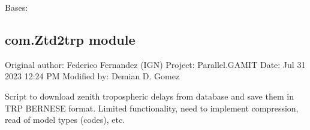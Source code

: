 \documentclass[letterpaper,10pt,english]{sphinxmanual}
\begin{document}
\begin{fulllineitems}
\label{\detokenize{com:com.UpdateEarthquakes.AddEarthquakes}}
\pysigstartsignatures
{}
\pysigstopsignatures
\sphinxAtStartPar
Bases: 

\end{fulllineitems}


\begin{fulllineitems}
\label{\detokenize{com:com.UpdateEarthquakes.getTimeSegments2}}
\pysigstartsignatures
{}
\pysigstopsignatures
\end{fulllineitems}


\begin{fulllineitems}
\label{\detokenize{com:com.UpdateEarthquakes.main}}
\pysigstartsignatures
{}
\pysigstopsignatures
\end{fulllineitems}



\subsection{com.Ztd2trp module}
\label{\detokenize{com:module-com.Ztd2trp}}\label{\detokenize{com:com-ztd2trp-module}}
\sphinxAtStartPar
Original author: Federico Fernandez (IGN)
Project: Parallel.GAMIT
Date: Jul 31 2023 12:24 PM
Modified by: Demian D. Gomez

\sphinxAtStartPar
Script to download zenith tropospheric delays from database and save them in TRP BERNESE format.
Limited functionality, need to implement compression, read of model types (codes), etc.
\end{document}
